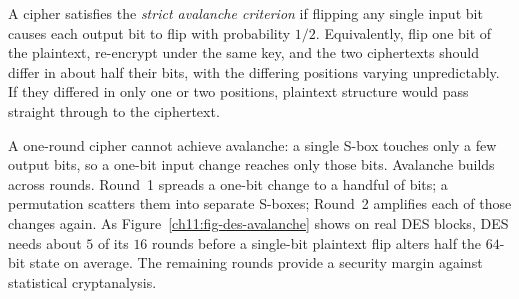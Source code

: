 A cipher satisfies the \emph{strict avalanche criterion} if flipping any single input bit causes each output bit to flip with probability $1/2$. Equivalently, flip one bit of the plaintext, re-encrypt under the same key, and the two ciphertexts should differ in about half their bits, with the differing positions varying unpredictably. If they differed in only one or two positions, plaintext structure would pass straight through to the ciphertext.

\begin{focusbox}
A one-round cipher cannot achieve avalanche: a single S-box touches only a few output bits, so a one-bit input change reaches only those bits. Avalanche builds across rounds. Round~1 spreads a one-bit change to a handful of bits; a permutation scatters them into separate S-boxes; Round~2 amplifies each of those changes again. As Figure~\ref{ch11:fig-des-avalanche} shows on real DES blocks, DES needs about $5$ of its $16$ rounds before a single-bit plaintext flip alters half the $64$-bit state on average. The remaining rounds provide a security margin against statistical cryptanalysis.
\end{focusbox}

